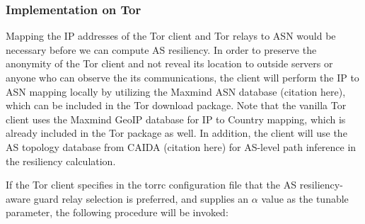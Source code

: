 
\subsubsection{Implementation on Tor}
Mapping the IP addresses of the Tor client and Tor relays to ASN would be necessary before we can compute AS resiliency. In order to preserve the anonymity of the Tor client and not reveal its location to outside servers or anyone who can observe the its communications, the client will perform the IP to ASN mapping locally by utilizing the Maxmind ASN database (citation here), which can be included in the Tor download package. Note that the vanilla Tor client uses the Maxmind GeoIP database for IP to Country mapping, which is already included in the Tor package as well. In addition, the client will use the AS topology database from CAIDA (citation here) for AS-level path inference in the resiliency calculation. 

If the Tor client specifies in the torrc configuration file that the AS resiliency-aware guard relay selection is preferred, and supplies an $\alpha$ value as the tunable parameter, the following procedure will be invoked:


